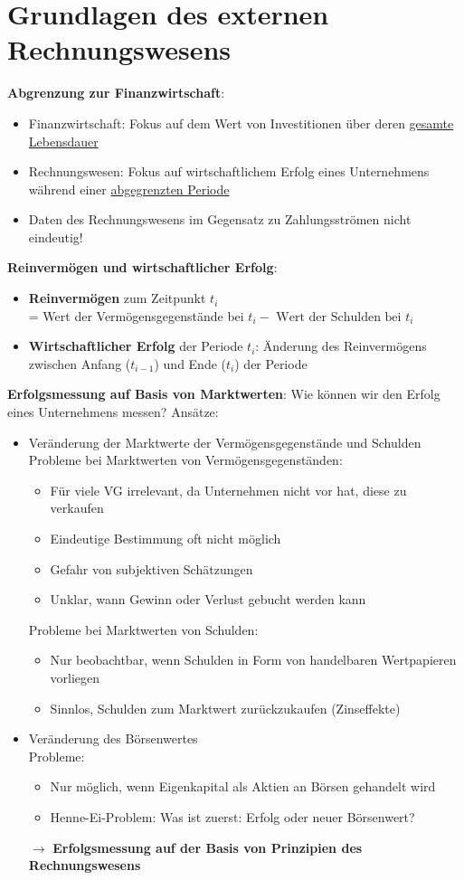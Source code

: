 \section{Grundlagen des externen Rechnungswesens}

\textbf{Abgrenzung zur Finanzwirtschaft}:
\begin{itemize}
	\item Finanzwirtschaft: Fokus auf dem Wert von Investitionen über deren \underline{gesamte Lebensdauer}
	\item Rechnungswesen: Fokus auf wirtschaftlichem Erfolg eines Unternehmens während einer \underline{abgegrenzten Periode}
	\item Daten des Rechnungswesens im Gegensatz zu Zahlungsströmen nicht eindeutig!
\end{itemize}
\bigskip
\textbf{Reinvermögen und wirtschaftlicher Erfolg}:
\begin{itemize}
	\item \textbf{Reinvermögen} zum Zeitpunkt $t_i$ 
	\\= Wert der Vermögensgegenstände bei $t_i - \text{ Wert der Schulden bei } t_i$ 
	\item \textbf{Wirtschaftlicher Erfolg} der Periode $t_i$: Änderung des Reinvermögens zwischen Anfang ($t_{i-1}$) und Ende ($t_i$) der Periode 
\end{itemize}
\bigskip
\textbf{Erfolgsmessung auf Basis von Marktwerten}:
Wie können wir den Erfolg eines Unternehmens messen?
Ansätze:
\begin{itemize}
	\item Veränderung der Marktwerte der Vermögensgegenstände und Schulden\\
	Probleme bei Marktwerten von Vermögensgegenständen:
	\begin{itemize}
		\item Für viele VG irrelevant, da Unternehmen nicht vor hat, diese zu verkaufen
		\item Eindeutige Bestimmung oft nicht möglich
		\item Gefahr von subjektiven Schätzungen
		\item Unklar, wann Gewinn oder Verlust gebucht werden kann
	\end{itemize}
	Probleme bei Marktwerten von Schulden:
	\begin{itemize}
		\item Nur beobachtbar, wenn Schulden in Form von handelbaren Wertpapieren vorliegen
		\item Sinnlos, Schulden zum Marktwert zurückzukaufen (Zinseffekte)
	\end{itemize}
	\item Veränderung des Börsenwertes\\
	Probleme:
	\begin{itemize}
		\item Nur möglich, wenn Eigenkapital als Aktien an Börsen gehandelt wird
		\item Henne-Ei-Problem: Was ist zuerst: Erfolg oder neuer Börsenwert?	
	\end{itemize}
	$\rightarrow$ \textbf{Erfolgsmessung auf der Basis von Prinzipien des Rechnungswesens}
\end{itemize}
